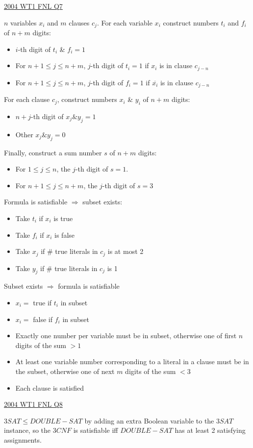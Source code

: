 \documentclass[10pt,landscape,a4paper]{article}
\begin{document}
\begin{multicols*}{3}
\underline{2004 WT1 FNL Q7}

$n$ variables $x_i$ and $m$ clauses $c_j$. For each variable $x_i$ construct numbers $t_i$ and $f_i$ of $n + m$ digits:

\begin{itemize}
    \item $i$-th digit of $t_i$ \& $f_i = 1$
    \item For $n + 1 \leq j \leq n + m$, $j$-th digit of $t_i = 1$ if $x_i$ is in clause $c_{j-n}$
    \item For $n + 1 \leq j \leq n + m$, $j$-th digit of $f_i = 1$ if $\overline{x_i}$ is in clause $c_{j-n}$
\end{itemize}

For each clause $c_j$, construct numbers $x_i$ \& $y_i$ of $n + m$ digits:

\begin{itemize}
    \item $n+j$-th digit of $x_j \& y_j = 1$
    \item Other $x_j \& y_j = 0$
\end{itemize}

Finally, construct a sum number $s$ of $n + m$ digits:

\begin{itemize}
    \item For $1 \leq j \leq n$, the $j$-th digit of $s = 1$.
    \item For $n + 1 \leq j \leq n + m$, the $j$-th digit of $s = 3$
\end{itemize}

Formula is satisfiable $\Rightarrow$ subset exists:

\begin{itemize}
    \item Take $t_i$ if $x_i$ is true
    \item Take $f_i$ if $x_i$ is false
    \item Take $x_j$ if \# true literals in $c_j$ is at most 2
    \item Take $y_j$ if \# true literals in $c_j$ is 1
\end{itemize}

Subset exists $\Rightarrow$ formula is satisfiable

\begin{itemize}
    \item $x_i = $ true if $t_i$ in subset
    \item $x_i = $ false if $f_i$ in subset
    \item Exactly one number per variable must be in subset, otherwise one of first $n$ digits of the sum $ > 1$
    \item At least one variable number corresponding to a literal in a clause must be in the subset, otherwise one of next $m$ digits of the sum $< 3$
    \item Each clause is satisfied
\end{itemize}

\underline{2004 WT1 FNL Q8}

$3SAT \leq DOUBLE-SAT$ by adding an extra Boolean variable to the $3SAT$ instance, so the $3CNF$ is satisfiable iff $DOUBLE-SAT$ has at least 2 satisfying assignments.

\end{multicols*}
\end{document}
